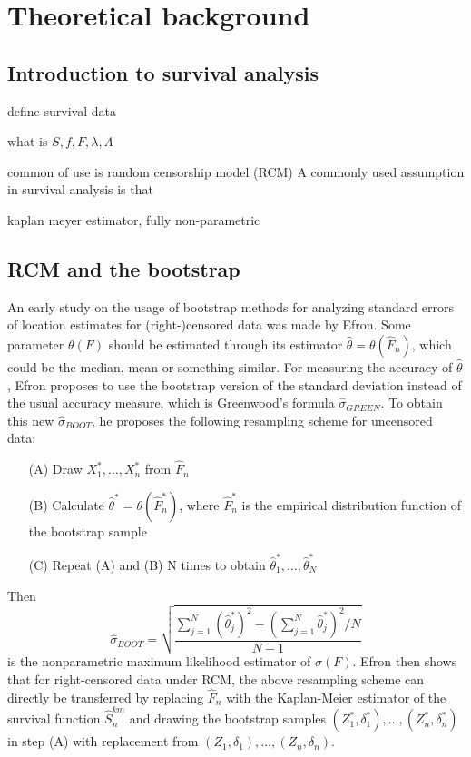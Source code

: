 \chapter{Theoretical background}



\section{Introduction to survival analysis}

define survival data

what is $S, f, F, \lambda, \Lambda$

common of use is random censorship model (RCM)
A commonly used assumption in survival analysis is that 

kaplan meyer estimator, fully non-parametric

\section{RCM and the bootstrap}

An early study on the usage of bootstrap methods for analyzing standard errors of location estimates for (right-)censored data was made by Efron\cite{PAPER1}. 
Some parameter $\theta(F)$ should be estimated through its estimator $\hat{\theta} = \theta(\hat{F}_n)$, which could be the median, mean or something similar. 
For measuring the accuracy of $\hat{\theta}$, Efron proposes to use the bootstrap version of the standard deviation instead of the usual accuracy measure, which is Greenwood's formula $\hat{\sigma}_{GREEN}$. To obtain this new $\hat{\sigma}_{BOOT}$, he proposes the following resampling scheme for uncensored data:
\begin{resampling_scheme}
\begin{itemize}
\item[(A)] Draw $X_1^*,\ldots,X_n^*$ from $\hat{F}_n$
\item[(B)] Calculate $\hat{\theta}^* = \theta(\hat{F}_n^*)$, where $\hat{F}_n^*$ is the empirical distribution function of the bootstrap sample
\item[(C)] Repeat (A) and (B) N times to obtain $\hat{\theta}_1^*,\ldots,\hat{\theta}_N^*$
\end{itemize}
\end{resampling_scheme}
Then 
\[
\hat{\sigma}_{BOOT} = \sqrt{\frac{\sum_{j=1}^{N}\left(\hat{\theta}_j^*\right)^2 - \left(\sum_{j=1}^{N}\hat{\theta}_j^*\right)^2/N}{N-1}}
\]
is the nonparametric maximum likelihood estimator of $\sigma(F)$.
Efron then shows that for right-censored data under RCM, the above resampling scheme can directly be transferred by replacing $\hat{F}_n$ with the Kaplan-Meier estimator of the survival function $\hat{S}_n^{km}$ and drawing the bootstrap samples $(Z_1^*,\delta_1^*),\ldots,(Z_n^*,\delta_n^*)$ in step (A) with replacement from $(Z_1,\delta_1),\ldots,(Z_n,\delta_n)$.

